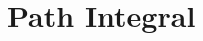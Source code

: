 \documentclass[12pt,a4paper]{article}
\begin{document}



\newcommand{\dd}{\mathrm d}











\section{Path Integral}
\end{document}

